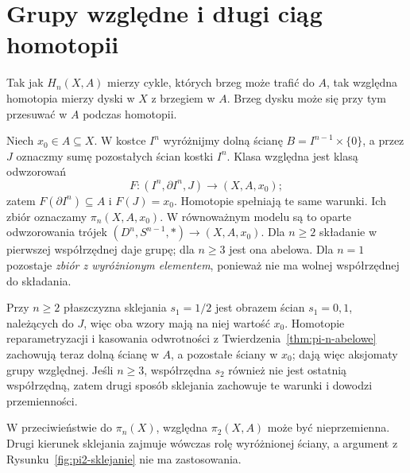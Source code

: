 \section{Grupy względne i długi ciąg homotopii}
\label{sec:pi-wzgledne}

Tak jak $H_n(X,A)$ mierzy cykle,
których brzeg może trafić do $A$,
tak względna homotopia mierzy
dyski w $X$ z brzegiem w $A$.
Brzeg dysku może się przy tym
przesuwać w $A$ podczas homotopii.

\begin{definicja}
\label{def:pi-wzgledne}
Niech $x_0\in A\subseteq X$.
W kostce $I^n$ wyróżnijmy
dolną ścianę $B=I^{n-1}\times\{0\}$,
a przez $J$ oznaczmy sumę
pozostałych ścian kostki $I^n$.
Klasa względna jest klasą odwzorowań
\[
 F:(I^n,\partial I^n,J)
       \longrightarrow(X,A,x_0);
\]
zatem $F(\partial I^n)\subseteq A$
i $F(J)=x_0$. Homotopie spełniają
te same warunki. Ich zbiór oznaczamy
$\pi_n(X,A,x_0)$.
W równoważnym modelu są to
oparte odwzorowania trójek
$(D^n,S^{n-1},*)\to(X,A,x_0)$.
Dla $n\geq2$ składanie w pierwszej
współrzędnej daje grupę; dla
$n\geq3$ jest ona abelowa.
Dla $n=1$ pozostaje \emph{zbiór
z wyróżnionym elementem},
ponieważ nie ma wolnej współrzędnej
do składania.
\end{definicja}

Przy $n\geq2$ płaszczyzna sklejania $s_1=1/2$ jest obrazem
ścian $s_1=0,1$, należących do $J$, więc oba wzory mają na niej
wartość $x_0$. Homotopie reparametryzacji i kasowania odwrotności
z Twierdzenia~\ref{thm:pi-n-abelowe} zachowują teraz dolną ścianę w $A$,
a pozostałe ściany w $x_0$; dają więc aksjomaty grupy względnej.
Jeśli $n\geq3$, współrzędna $s_2$ również nie jest ostatnią współrzędną,
zatem drugi sposób sklejania zachowuje te warunki i dowodzi przemienności.

W przeciwieństwie do $\pi_n(X)$,
względna $\pi_2(X,A)$ może być
nieprzemienna. Drugi kierunek
sklejania zajmuje wówczas rolę
wyróżnionej ściany, a argument
z Rysunku~\ref{fig:pi2-sklejanie}
nie ma zastosowania.

